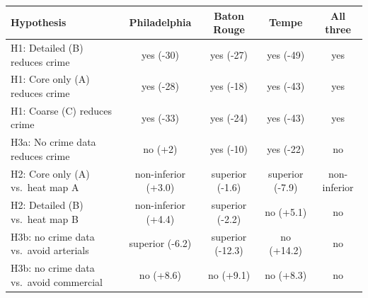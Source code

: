 \begin{tabular}{lcccc}
\toprule
Hypothesis & Philadelphia & Baton Rouge & Tempe & All three \\
\midrule
H1: Detailed (B) reduces crime & yes (-30) & yes (-27) & yes (-49) & yes \\
H1: Core only (A) reduces crime & yes (-28) & yes (-18) & yes (-43) & yes \\
H1: Coarse (C) reduces crime & yes (-33) & yes (-24) & yes (-43) & yes \\
H3a: No crime data reduces crime & no (+2) & yes (-10) & yes (-22) & no \\
H2: Core only (A) vs.\ heat map A & non-inferior (+3.0) & superior (-1.6) & superior (-7.9) & non-inferior \\
H2: Detailed (B) vs.\ heat map B & non-inferior (+4.4) & superior (-2.2) & no (+5.1) & no \\
H3b: no crime data vs.\ avoid arterials & superior (-6.2) & superior (-12.3) & no (+14.2) & no \\
H3b: no crime data vs.\ avoid commercial & no (+8.6) & no (+9.1) & no (+8.3) & no \\
\bottomrule
\end{tabular}
